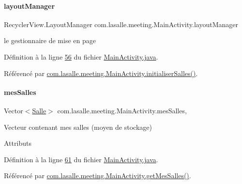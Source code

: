 \paragraph{\texorpdfstring{layout\+Manager}{layoutManager}}
{\footnotesize\ttfamily Recycler\+View.\+Layout\+Manager com.\+lasalle.\+meeting.\+Main\+Activity.\+layout\+Manager\hspace{0.3cm}{\ttfamily [private]}}



le gestionnaire de mise en page 



Définition à la ligne \hyperlink{_main_activity_8java_source_l00056}{56} du fichier \hyperlink{_main_activity_8java_source}{Main\+Activity.\+java}.



Référencé par \hyperlink{_main_activity_8java_source_l00213}{com.\+lasalle.\+meeting.\+Main\+Activity.\+initialiser\+Salles()}.

\mbox{\label{classcom_1_1lasalle_1_1meeting_1_1_main_activity_ab13e34516d877abc3ba937505b441979}} 
\paragraph{\texorpdfstring{mes\+Salles}{mesSalles}}
{\footnotesize\ttfamily Vector$<$\hyperlink{classcom_1_1lasalle_1_1meeting_1_1_salle}{Salle}$>$ com.\+lasalle.\+meeting.\+Main\+Activity.\+mes\+Salles\hspace{0.3cm}{\ttfamily [static]}, {\ttfamily [private]}}



Vecteur contenant mes salles (moyen de stockage) 

Attributs 

Définition à la ligne \hyperlink{_main_activity_8java_source_l00061}{61} du fichier \hyperlink{_main_activity_8java_source}{Main\+Activity.\+java}.



Référencé par \hyperlink{_main_activity_8java_source_l00470}{com.\+lasalle.\+meeting.\+Main\+Activity.\+get\+Mes\+Salles()}.

\mbox{\label{classcom_1_1lasalle_1_1meeting_1_1_main_activity_a365f2a56de5a65551e62a12708b917f8}} 
